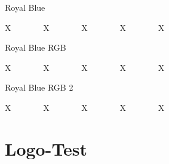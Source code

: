 \documentclass[
ngerman,
paper=a4,
asymmetric,
fontsize=10pt,
draft=false,
numbers=noenddot,
bibtotocnumbered,
footnotes=multiple,
toc=flat,
]{scrbook}
\begin{document}
\begin{WidePar}
{\noindent Royal Blue

\noindent\colorbox{DefaultA}{\textcolor{DefaultA}{X~~~~~}}~~
\colorbox{DefaultB}{\textcolor{DefaultB}{X~~~~~}}~~
\colorbox{DefaultC}{\textcolor{DefaultC}{X~~~~~}}~~
\colorbox{DefaultD}{\textcolor{DefaultD}{X~~~~~}}~~
\colorbox{DefaultE}{\textcolor{DefaultE}{X~~~~~}}~~
\bigskip


\noindent Royal Blue RGB

\noindent\colorbox{DefaultA}{\textcolor{DefaultA}{X~~~~~}}~~
\colorbox{DefaultB}{\textcolor{DefaultB}{X~~~~~}}~~
\colorbox{DefaultC}{\textcolor{DefaultC}{X~~~~~}}~~
\colorbox{DefaultD}{\textcolor{DefaultD}{X~~~~~}}~~
\colorbox{DefaultE}{\textcolor{DefaultE}{X~~~~~}}~~
\bigskip


\noindent Royal Blue RGB 2

\noindent\colorbox{DefaultA}{\textcolor{DefaultA}{X~~~~~}}~~
\colorbox{DefaultB}{\textcolor{DefaultB}{X~~~~~}}~~
\colorbox{DefaultC}{\textcolor{DefaultC}{X~~~~~}}~~
\colorbox{DefaultD}{\textcolor{DefaultD}{X~~~~~}}~~
\colorbox{DefaultE}{\textcolor{DefaultE}{X~~~~~}}~~
\bigskip



}
\end{WidePar}

\bigskip

\noindent{\ttfamily{\the\WideParWidth}
{\the\ThirdGrossWidth}
{\the\ThirdNetWidth}}

\section{Logo-Test}



\bigskip


\vspace{3\baselineskip}
\end{document}
